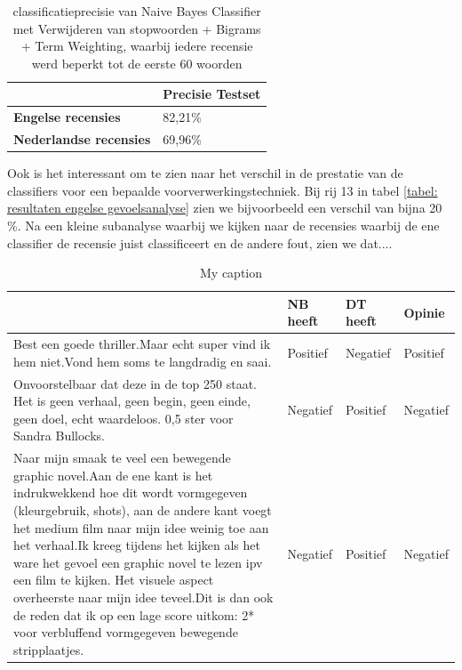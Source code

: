 \begin{table}[h]
\centering
\begin{tabular}{l|l|}
\cline{2-2}
                                                  & {\bf Precisie Testset} \\ \hline
\multicolumn{1}{|l|}{{\bf Engelse recensies}}     & 82,21\%                \\ \hline
\multicolumn{1}{|l|}{{\bf Nederlandse recensies}} & 69,96\%                \\ \hline
\end{tabular}
\caption{classificatieprecisie van Naive Bayes Classifier met Verwijderen van stopwoorden + Bigrams + Term Weighting, waarbij iedere recensie werd beperkt tot de eerste 60 woorden}
\end{table}

Ook is het interessant om te zien naar het verschil in de prestatie van de classifiers voor een bepaalde voorverwerkingstechniek. Bij rij 13 in tabel \ref{tabel: resultaten engelse gevoelsanalyse} zien we bijvoorbeeld een verschil van bijna 20 \%. Na een kleine subanalyse waarbij we kijken naar de recensies waarbij de ene classifier de recensie juist classificeert en de andere fout, zien we dat....\\

\begin{table}[h]
\centering
\caption{My caption}
\label{my-label}
\begin{tabu}{|p{\myWidth}|l|l|l|}  %
\hline
 & {\bf NB heeft} & {\bf DT heeft} & {\bf Opinie} \\ \hline
Best een goede thriller.Maar echt super vind ik hem niet.Vond hem soms te langdradig en saai. & Positief & Negatief & Positief \\ \hline
Onvoorstelbaar dat deze in de top 250 staat. Het is geen verhaal, geen begin, geen einde, geen doel, echt waardeloos. 0,5 ster voor Sandra Bullocks. & Negatief & Positief & Negatief \\ \hline
Naar mijn smaak te veel een bewegende graphic novel.Aan de ene kant is het indrukwekkend hoe dit wordt vormgegeven (kleurgebruik, shots), aan de andere kant voegt het medium film naar mijn idee weinig toe aan het verhaal.Ik kreeg tijdens het kijken als het ware het gevoel een graphic novel te lezen ipv een film te kijken. Het visuele aspect overheerste naar mijn idee teveel.Dit is dan ook de reden dat ik op een lage score uitkom: 2* voor verbluffend vormgegeven bewegende stripplaatjes. & Negatief & Positief & Negatief \\ \hline
\end{tabu}
\end{table}

